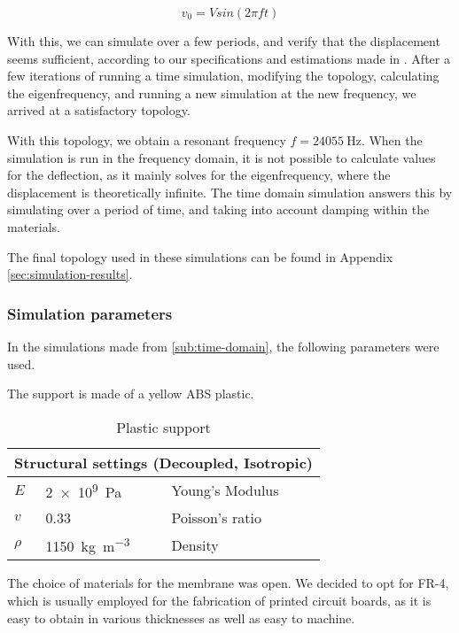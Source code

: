 \begin{equation}
  v_0 = V sin(2\pi f t)
  \label{eq:v0}
\end{equation}

With this, we can simulate over a few periods, and verify that the displacement
seems sufficient, according to our specifications and estimations made in
. After a few iterations of running a time simulation,
modifying the topology, calculating the eigenfrequency, and running a new
simulation at the new frequency, we arrived at a satisfactory topology.


With this topology, we obtain a resonant frequency $f = \SI{24055}{\hertz}$.
When the simulation is run in the frequency domain, it is not possible to
calculate values for the deflection, as it mainly solves for the eigenfrequency,
where the displacement is theoretically infinite. The time domain simulation
answers this by simulating over a period of time, and taking into account
damping within the materials.

The final topology used in these simulations can be found in Appendix
\ref{sec:simulation-results}.

\pagebreak
\subsubsection{Simulation parameters}
In the simulations made from \ref{sub:time-domain}, the following parameters
were used.

The support is made of a yellow ABS plastic.

\begin{table}[!h]
  \centering
  \begin{tabular}{l|l|l}
    \multicolumn{3}{l}{Structural settings (Decoupled, Isotropic)}	\\
    \hline
    $E$		& \SI{2e9}{\pascal} 	& Young's Modulus 	\\
    $v$		& \SI{0.33}{}		& Poisson's ratio	\\
    $\rho$	& \SI{1150}{\kilo\gram\per\cubic\metre}	& Density	\\
  \end{tabular}
  \caption{Plastic support}
  \label{tab:properties-plastic}
\end{table}

The choice of materials for the membrane was open. We decided to opt for FR-4,
which is usually employed for the fabrication of printed circuit boards, as it
is easy to obtain in various thicknesses as well as easy to machine.

